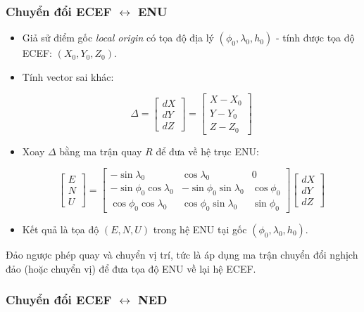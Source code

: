 \subsubsection{Chuyển đổi ECEF $\leftrightarrow$ ENU}
\begin{itemize}
  \item Giả sử điểm gốc \textit{local origin} có tọa độ địa lý $(\phi_0, \lambda_0, h_0)$ - tính được tọa độ ECEF: $(X_0, Y_0, Z_0)$.
  \item Tính vector sai khác:
  

\[
  \Delta = 
  \begin{bmatrix}
  dX \\
  dY \\
  dZ
  \end{bmatrix}
  =
  \begin{bmatrix}
  X - X_0 \\
  Y - Y_0 \\
  Z - Z_0
  \end{bmatrix}
  \]


  \item Xoay $\Delta$ bằng ma trận quay $R$ để đưa về hệ trục ENU:
  

\[
  \begin{bmatrix}
  E \\
  N \\
  U
  \end{bmatrix}
  =
  \begin{bmatrix}
  -\sin\lambda_0 & \cos\lambda_0 & 0 \\
  -\sin\phi_0\cos\lambda_0 & -\sin\phi_0\sin\lambda_0 & \cos\phi_0 \\
  \cos\phi_0\cos\lambda_0 & \cos\phi_0\sin\lambda_0 & \sin\phi_0
  \end{bmatrix}
  \begin{bmatrix}
  dX \\
  dY \\
  dZ
  \end{bmatrix}
  \]


  \item Kết quả là tọa độ $(E, N, U)$ trong hệ ENU tại gốc $(\phi_0, \lambda_0, h_0)$.
\end{itemize}

Đảo ngược phép quay và chuyển vị trí, tức là áp dụng ma trận chuyển đổi nghịch đảo (hoặc chuyển vị) để đưa tọa độ ENU về lại hệ ECEF.


\subsubsection{Chuyển đổi ECEF $\leftrightarrow$ NED}

